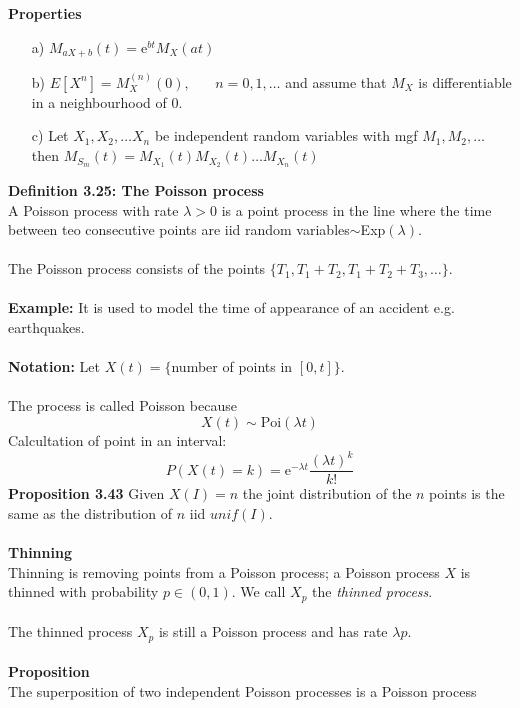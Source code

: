 \documentclass[12pt,a4paper,draft]{report}
\begin{document}
\textbf{Properties}\\
\begin{itemize}
\setlength\itemsep{0em}
\item[a)] $M_{aX+b}(t)=\mathrm{e}^{bt}M_X(at)$
\item[b)] $E[X^n]=M_X^{(n)}(0),\phantom{mm}n=0,1,\ldots$ and assume that $M_X$ is differentiable in a neighbourhood of 0.
\item[c)] Let $X_1,X_2,\ldots X_n$ be independent random variables with mgf $M_1,M_2,\ldots$ then $M_{S_m}(t)=M_{X_1}(t)M_{X_2}(t)\ldots M_{X_n}(t)$
\end{itemize}
\textbf{Definition 3.25: The Poisson process}\\
A Poisson process with rate $\lambda>0$ is a point process in the line where the time between teo consecutive points are iid random variables$\sim$Exp$(\lambda)$.\\\\
The Poisson process consists of the points $\{T_1,T_1+T_2,T_1+T_2+T_3,\ldots\}$.\\\\
\textbf{Example:} It is used to model the time of appearance of an accident e.g. earthquakes.\\\\
\textbf{Notation:} Let $X(t)=\{$number of points in $[0,t]\}$.\\\\
The process is called Poisson because
\begin{equation}
X(t)\sim\text{Poi}(\lambda t)
\end{equation}
Calcultation of point in an interval:
\begin{equation}
P(X(t)=k)=\mathrm{e}^{-\lambda t}\frac{(\lambda t)^k}{k!}
\end{equation}
\textbf{Proposition 3.43} Given $X(I)=n$ the joint distribution of the $n$ points is the same as the distribution of $n$ iid $unif(I)$.\\\\
\textbf{Thinning}\\
Thinning is removing points from a Poisson process; a Poisson process $X$ is thinned with probability $p\in(0,1)$. We call $X_p$ the \textit{thinned process}.\\\\
The thinned process $X_p$ is still a Poisson process and has rate $\lambda p$.\\\\
\textbf{Proposition}\\
The superposition of two independent Poisson processes is a Poisson process
\end{document}
